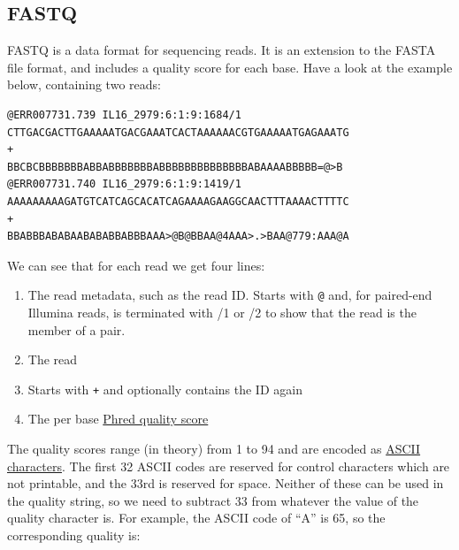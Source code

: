 \documentclass[11pt]{article}
\makeatletter
\providecommand{\tightlist}{%
      \setlength{\itemsep}{0pt}\setlength{\parskip}{0pt}}
\newcommand{\boxspacing}{\kern\kvtcb@left@rule\kern\kvtcb@boxsep}
\newcommand{\prompt}[4]{
        {\ttfamily\llap{{\color{#2}[#3]:\hspace{3pt}#4}}\vspace{-\baselineskip}}
    }
\makeatother
\begin{document}
    \begin{tcolorbox}[breakable, size=fbox, boxrule=1pt, pad at break*=1mm,colback=cellbackground, colframe=cellborder]
\prompt{In}{incolor}{ }{\boxspacing}
\begin{Verbatim}[commandchars=\\\{\}]

\end{Verbatim}
\end{tcolorbox}

    \hypertarget{fastq}{%
\subsection{FASTQ}\label{fastq}}

FASTQ is a data format for sequencing reads. It is an extension to the
FASTA file format, and includes a quality score for each base. Have a
look at the example below, containing two reads:

\begin{verbatim}
@ERR007731.739 IL16_2979:6:1:9:1684/1
CTTGACGACTTGAAAAATGACGAAATCACTAAAAAACGTGAAAAATGAGAAATG
+
BBCBCBBBBBBBABBABBBBBBBABBBBBBBBBBBBBBABAAAABBBBB=@>B
@ERR007731.740 IL16_2979:6:1:9:1419/1
AAAAAAAAAGATGTCATCAGCACATCAGAAAAGAAGGCAACTTTAAAACTTTTC
+
BBABBBABABAABABABBABBBAAA>@B@BBAA@4AAA>.>BAA@779:AAA@A
\end{verbatim}

We can see that for each read we get four lines:

\begin{enumerate}
\def\labelenumi{\arabic{enumi}.}
\tightlist
\item
  The read metadata, such as the read ID. Starts with \texttt{@} and,
  for paired-end Illumina reads, is terminated with /1 or /2 to show
  that the read is the member of a pair.
\item
  The read
\item
  Starts with \texttt{+} and optionally contains the ID again
\item
  The per base
  \href{https://en.wikipedia.org/wiki/Phred_quality_score}{Phred quality
  score}
\end{enumerate}

The quality scores range (in theory) from 1 to 94 and are encoded as
\href{https://en.wikipedia.org/wiki/ASCII}{ASCII characters}. The first
32 ASCII codes are reserved for control characters which are not
printable, and the 33rd is reserved for space. Neither of these can be
used in the quality string, so we need to subtract 33 from whatever the
value of the quality character is. For example, the ASCII code of ``A''
is 65, so the corresponding quality is:
\end{document}
